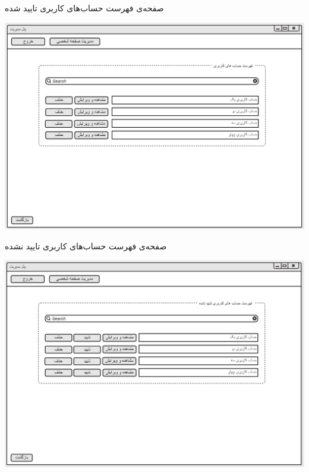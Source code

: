 \documentclass{article}
\begin{document}
\newpage
\vspace{1cm}
صفحه‌ی فهرست حساب‌های کاربری تایید شده
\begin{center}
\includegraphics[width=\textwidth]{Prototype/HeadManager/VerifiedAccountsList.png}
\end{center}

\vspace{1cm}
صفحه‌ی فهرست حساب‌های کاربری تایید نشده
\begin{center}
\includegraphics[width=\textwidth]{Prototype/HeadManager/UnverifiedAccountsList.png}
\end{center}
\end{document}
